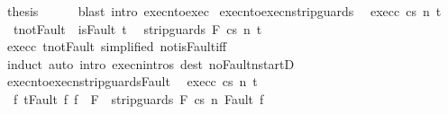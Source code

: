 \begin{isabellebody}
\ {\isacharquery}thesis\isanewline
\ \ \ \ \isamarkupfalse%
\ {\isacharparenleft}blast\ intro{\isacharcolon}\ execn{\isacharunderscore}to{\isacharunderscore}exec{\isacharparenright}\isanewline
{}\isamarkupfalse%
%
\endisatagproof
{\isafoldproof}%
%
\isadelimproof
%
\endisadelimproof
%
\isamarkuptrue%
\isamarkupfalse%
\ execn{\isacharunderscore}to{\isacharunderscore}execn{\isacharunderscore}strip{\isacharunderscore}guards{\isacharcolon}\isanewline
\ \ exec{\isacharunderscore}c{\isacharcolon}\ {\isachardoublequoteopen}{\isasymGamma}{\isasymturnstile}{\isasymlangle}c{\isacharcomma}s{\isasymrangle}\ {\isacharequal}n{\isasymRightarrow}\ t{\isachardoublequoteclose}\ \isanewline
\ \ t{\isacharunderscore}not{\isacharunderscore}Fault{\isacharcolon}\ {\isachardoublequoteopen}{\isasymnot}\ isFault\ t{\isachardoublequoteclose}\isanewline
\ \ {\isachardoublequoteopen}{\isasymGamma}{\isasymturnstile}{\isasymlangle}strip{\isacharunderscore}guards\ F\ c{\isacharcomma}s{\isasymrangle}\ {\isacharequal}n{\isasymRightarrow}\ t\ {\isachardoublequoteclose}\isanewline
%
\isadelimproof
%
\endisadelimproof
%
\isatagproof
{}\isamarkupfalse%
\ exec{\isacharunderscore}c\ t{\isacharunderscore}not{\isacharunderscore}Fault\ {\isacharbrackleft}simplified\ not{\isacharunderscore}isFault{\isacharunderscore}iff{\isacharbrackright}\isanewline
{}\isamarkupfalse%
\ {\isacharparenleft}induct{\isacharparenright}\ {\isacharparenleft}auto\ intro{\isacharcolon}\ execn{\isachardot}intros\ dest{\isacharcolon}\ noFaultn{\isacharunderscore}startD{\isacharprime}{\isacharparenright}%
\endisatagproof
{\isafoldproof}%
%
\isadelimproof
\isanewline
%
\endisadelimproof
\isanewline
\isanewline
{}\isamarkupfalse%
\ execn{\isacharunderscore}to{\isacharunderscore}execn{\isacharunderscore}strip{\isacharunderscore}guards{\isacharunderscore}Fault{\isacharcolon}\isanewline
\ \ exec{\isacharunderscore}c{\isacharcolon}\ {\isachardoublequoteopen}{\isasymGamma}{\isasymturnstile}{\isasymlangle}c{\isacharcomma}s{\isasymrangle}\ {\isacharequal}n{\isasymRightarrow}\ t{\isachardoublequoteclose}\isanewline
\ \ {\isachardoublequoteopen}{\isasymAnd}f{\isachardot}\ {\isasymlbrakk}t{\isacharequal}Fault\ f{\isacharsemicolon}\ f\ {\isasymnotin}\ F{\isasymrbrakk}\ {\isasymLongrightarrow}\ {\isasymGamma}{\isasymturnstile}{\isasymlangle}strip{\isacharunderscore}guards\ F\ c{\isacharcomma}s{\isasymrangle}\ {\isacharequal}n{\isasymRightarrow}\ Fault\ f{\isachardoublequoteclose}\isanewline

\end{isabellebody}
